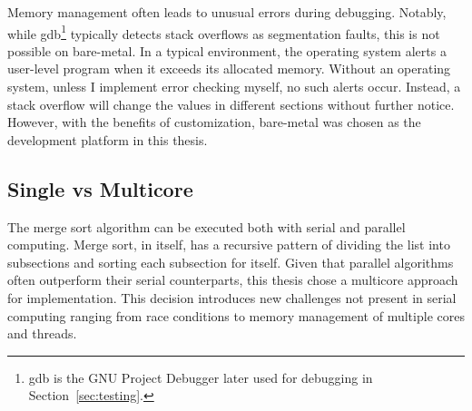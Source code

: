 Memory management often leads to unusual errors during debugging. Notably, while
gdb\footnote{gdb is the GNU Project Debugger later used for debugging in
Section~\ref{sec:testing}.} typically detects stack overflows as segmentation
faults, this is not possible on bare-metal. In a typical environment, the
operating system alerts a user-level program when it exceeds its allocated
memory. Without an operating system, unless I implement error checking myself,
no such alerts occur. Instead, a stack overflow will change the values in
different sections without further notice. However, with the benefits of
customization, bare-metal was chosen as the development platform in this thesis.

\subsection{Single vs Multicore}\label{sec:singlevsmulti}
The merge sort algorithm can be executed both with serial and parallel
computing. Merge sort, in itself, has a recursive pattern of dividing the list
into subsections and sorting each subsection for itself. Given that parallel
algorithms often outperform their serial counterparts, this thesis chose a
multicore approach for implementation. \cite{comp_parallel} This decision
introduces new challenges not present in serial computing ranging from race
conditions to memory management of multiple cores and threads.

